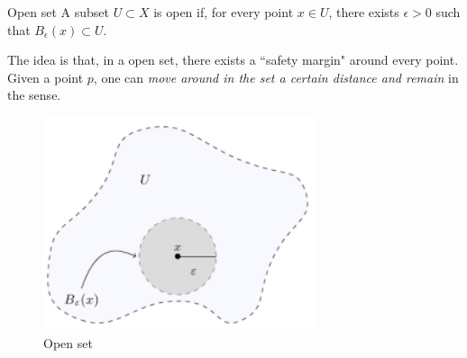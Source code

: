 \begin{defn}{Open set}{}
A subset $U \subset X$ is open if, for every point $x \in U$, there exists $\epsilon > 0$ such that $B_{\epsilon}(x) \subset U$.
\end{defn}

The idea is that, in a open set, there exists a ``safety margin" around every point. Given a point $p$, one can \emph{move around in the set a certain distance and remain} in the sense.

\begin{figure}[H]
    \centering
    \includegraphics[width=8cm]{images/open_set.png}
    \caption{Open set}
\end{figure}